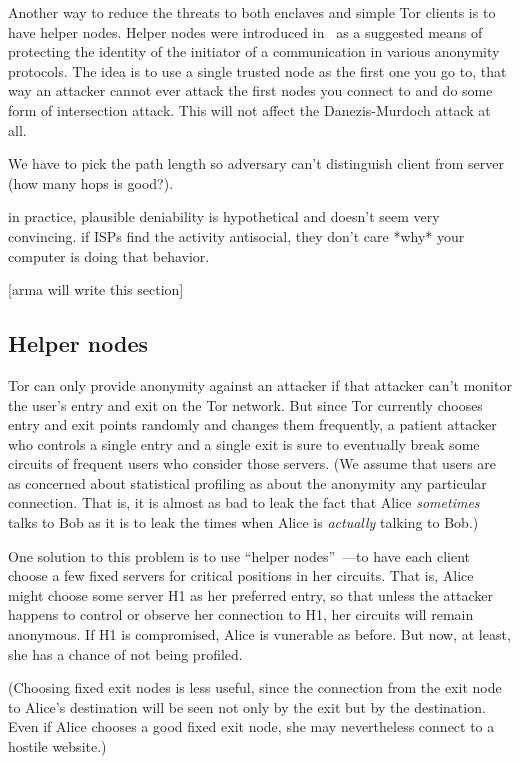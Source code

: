 \documentclass{llncs}
\begin{document}
Another way to reduce the threats to both enclaves and simple Tor
clients is to have helper nodes. Helper nodes were introduced
in~\cite{wright03} as a suggested means of protecting the identity
of the initiator of a communication in various anonymity protocols.
The idea is to use a single trusted node as the first one you go to,
that way an attacker cannot ever attack the first nodes you connect
to and do some form of intersection attack. This will not affect the
Danezis-Murdoch attack at all.

We have to pick the path length so adversary can't distinguish client from
server (how many hops is good?).

in practice, plausible deniability is hypothetical and doesn't seem very
convincing. if ISPs find the activity antisocial, they don't care *why*
your computer is doing that behavior.

[arma will write this section]

\subsection{Helper nodes}
\label{subsec:helper-nodes}

Tor can only provide anonymity against an attacker if that attacker can't
monitor the user's entry and exit on the Tor network.  But since Tor
currently chooses entry and exit points randomly and changes them frequently,
a patient attacker who controls a single entry and a single exit is sure to
eventually break some circuits of frequent users who consider those servers.
(We assume that users are as concerned about statistical profiling as about
the anonymity any particular connection.  That is, it is almost as bad to
leak the fact that Alice {\it sometimes} talks to Bob as it is to leak the times
when Alice is {\it actually} talking to Bob.)


One solution to this problem is to use ``helper nodes''~\cite{helpers}---to
have each client choose a few fixed servers for critical positions in her
circuits.  That is, Alice might choose some server H1 as her preferred
entry, so that unless the attacker happens to control or observe her
connection to H1, her circuits will remain anonymous.  If H1 is compromised,
Alice is vunerable as before.  But now, at least, she has a chance of
not being profiled.

(Choosing fixed exit nodes is less useful, since the connection from the exit
node to Alice's destination will be seen not only by the exit but by the
destination.  Even if Alice chooses a good fixed exit node, she may
nevertheless connect to a hostile website.)
\end{document}
